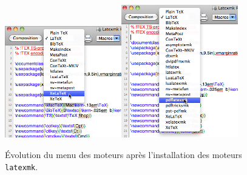 \documentclass[11pt,french]{article}
\newcommand{\TS}{\textsf{\TeX Shop}}
\begin{document}
\begin{figure}
\centering
\includegraphics[width=2in]{figs/avant}\qquad\includegraphics[width=2in]{figs/apres}
\caption{Évolution du menu des moteurs après l'installation des moteurs \texttt{latexmk}.\label{figs:popupmenus}}
\end{figure}

%
%
\end{document}
